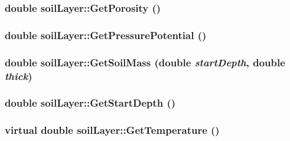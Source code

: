 \label{classsoil_layer_ae96a8b15fed4200fee1a8001599e3c8d}
\hypertarget{classsoil_layer_a7a50b8f89f7bc086de8ed078b729e1a3}{
\subsubsection[{GetPorosity}]{\setlength{\rightskip}{0pt plus 5cm}double soilLayer::GetPorosity ()}}
\label{classsoil_layer_a7a50b8f89f7bc086de8ed078b729e1a3}
\hypertarget{classsoil_layer_a2e1226d73b8a72c05e1821aea577f983}{
\subsubsection[{GetPressurePotential}]{\setlength{\rightskip}{0pt plus 5cm}double soilLayer::GetPressurePotential ()}}
\label{classsoil_layer_a2e1226d73b8a72c05e1821aea577f983}
\hypertarget{classsoil_layer_a4b942365583f2cb8356cdef3cebe8dde}{
\subsubsection[{GetSoilMass}]{\setlength{\rightskip}{0pt plus 5cm}double soilLayer::GetSoilMass (double {\em startDepth}, \/  double {\em thick})}}
\label{classsoil_layer_a4b942365583f2cb8356cdef3cebe8dde}
\hypertarget{classsoil_layer_a067dc1539ac09a475b678ef6d67b2812}{
\subsubsection[{GetStartDepth}]{\setlength{\rightskip}{0pt plus 5cm}double soilLayer::GetStartDepth ()}}
\label{classsoil_layer_a067dc1539ac09a475b678ef6d67b2812}
\hypertarget{classsoil_layer_a4767a2f084104f8c8407af7a6c7d7513}{
\subsubsection[{GetTemperature}]{\setlength{\rightskip}{0pt plus 5cm}virtual double soilLayer::GetTemperature ()}}
